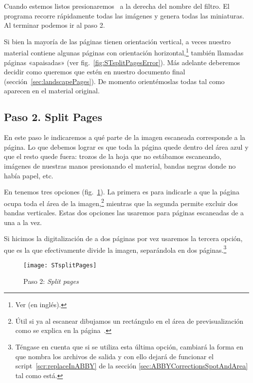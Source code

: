 \documentclass[%
	a5paper,
	10pt,
	twoside,
	openright,
	final,
]{memoir}
\begin{document}
	Cuando estemos listos presionaremos \play\ a la derecha del nombre del filtro. El programa recorre rápidamente todas las imágenes y genera todas las miniaturas. Al terminar podemos ir al paso 2.

	 Si bien la mayoría de las páginas tienen orientación vertical, a veces nuestro material contiene algunas páginas con orientación horizontal,\footnote{Ver \cite{WikipediaPageOrientation} (en inglés).} también llamadas páginas «apaisadas» (ver fig.~\ref{fig:STsplitPagesError}). Más adelante deberemos decidir como queremos que estén en nuestro documento final (sección~\ref{sec:landscapePages}). De momento orientémoslas todas tal como aparecen en el material original.

	\subsection{Paso 2. Split Pages\label{sec:STsplitPages}} En este paso le indicaremos a \scantailor qué parte de la imagen escaneada corresponde a la página. Lo que debemos lograr es que toda la página quede dentro del área azul y que el resto quede fuera: trozos de la hoja que no estábamos escaneando, imágenes de nuestras manos presionando el material, bandas negras donde no había papel, etc.

	En  tenemos tres opciones (fig.~\ref{fig:STsplitPages}). La primera es para indicarle a \scantailor que la página ocupa toda el área de la imagen,\footnote{Útil si ya al escanear dibujamos un rectángulo en el área de previsualización como se explica en la página~\pageref{pag:scanningRegionSelection}.} mientras que la segunda permite excluir dos bandas verticales. Estas dos opciones las usaremos para páginas escaneadas de a una a la vez.

	Si hicimos la digitalización de a dos páginas por vez usaremos la tercera opción, que es la que efectivamente divide la imagen, separándola en dos páginas.\footnote{Téngase en cuenta que si se utiliza esta última opción, cambiará la forma en que \scantailor nombra los archivos de salida y con ello dejará de funcionar el script~\ref{scr:replaceInABBY} de la sección \ref{sec:ABBYCorrectionsSpotAndArea} tal como está.}

	\begin{figure}
		\centering
		\texttt{[image: STsplitPages]}
		\caption{Paso 2: \emph{Split pages}\label{fig:STsplitPages}}
	\end{figure}
\end{document}

